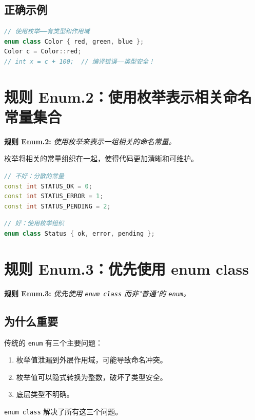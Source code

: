 \subsection{正确示例}

\begin{lstlisting}[language=C++]
// 使用枚举——有类型和作用域
enum class Color { red, green, blue };
Color c = Color::red;
// int x = c + 100;  // 编译错误——类型安全！
\end{lstlisting}

\section{规则 Enum.2：使用枚举表示相关命名常量集合}

\textbf{规则 Enum.2:} \textit{使用枚举来表示一组相关的命名常量。}

枚举将相关的常量组织在一起，使得代码更加清晰和可维护。

\begin{lstlisting}[language=C++]
// 不好：分散的常量
const int STATUS_OK = 0;
const int STATUS_ERROR = 1;
const int STATUS_PENDING = 2;
\end{lstlisting}

\begin{lstlisting}[language=C++]
// 好：使用枚举组织
enum class Status { ok, error, pending };
\end{lstlisting}

\section{规则 Enum.3：优先使用 enum class}

\textbf{规则 Enum.3:} \textit{优先使用 \texttt{enum class} 而非"普通"的 \texttt{enum}。}

\subsection{为什么重要}

传统的 \texttt{enum} 有三个主要问题：
\begin{enumerate}
  \item 枚举值泄漏到外层作用域，可能导致命名冲突。
  \item 枚举值可以隐式转换为整数，破坏了类型安全。
  \item 底层类型不明确。
\end{enumerate}

\texttt{enum class} 解决了所有这三个问题。

